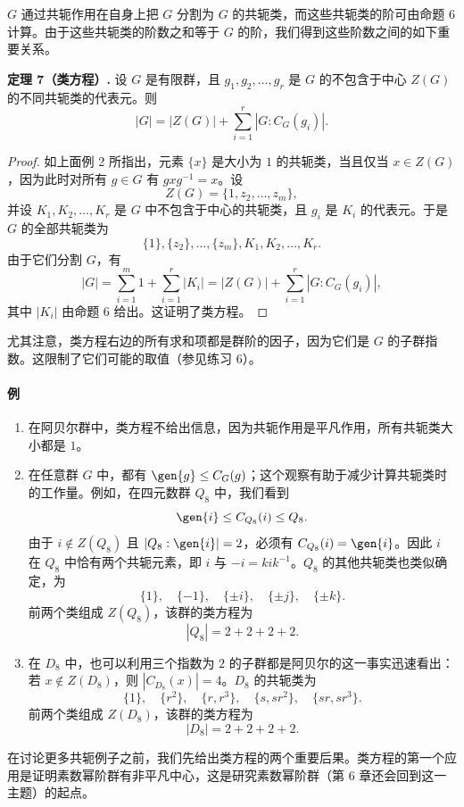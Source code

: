 $G$ 通过共轭作用在自身上把 $G$ 分割为 $G$ 的共轭类，而这些共轭类的阶可由命题 6 计算。由于这些共轭类的阶数之和等于 $G$ 的阶，我们得到这些阶数之间的如下重要关系。

\medskip
\noindent\textbf{定理 7（类方程）.} 设 $G$ 是有限群，且 $g_1,g_2,\ldots,g_r$ 是 $G$ 的不包含于中心 $Z(G)$ 的不同共轭类的代表元。则
\[
  |G|=|Z(G)|+\sum_{i=1}^r |G:C_G(g_i)|.
\]

\begin{proof}
如上面例 2 所指出，元素 $\{x\}$ 是大小为 $1$ 的共轭类，当且仅当 $x\in Z(G)$，因为此时对所有 $g\in G$ 有 $gxg^{-1}=x$。设
\[
  Z(G)=\{1,z_2,\ldots,z_m\},
\]
并设 $K_1,K_2,\ldots,K_r$ 是 $G$ 中不包含于中心的共轭类，且 $g_i$ 是 $K_i$ 的代表元。于是 $G$ 的全部共轭类为
\[
  \{1\},\{z_2\},\ldots,\{z_m\},K_1,K_2,\ldots,K_r.
\]
由于它们分割 $G$，有
\[
  |G|=\sum_{i=1}^m1+\sum_{i=1}^r |K_i|
      =|Z(G)|+\sum_{i=1}^r |G:C_G(g_i)|,
\]
其中 $|K_i|$ 由命题 6 给出。这证明了类方程。
\end{proof}

尤其注意，类方程右边的所有求和项都是群阶的因子，因为它们是 $G$ 的子群指数。这限制了它们可能的取值（参见练习 6）。

\paragraph{例}
\begin{enumerate}[label=(\arabic*)]
  \item 在阿贝尔群中，类方程不给出信息，因为共轭作用是平凡作用，所有共轭类大小都是 $1$。
  \item 在任意群 $G$ 中，都有 $\gen{g}\leq C_G(g)$；这个观察有助于减少计算共轭类时的工作量。例如，在四元数群 $Q_8$ 中，我们看到
  \[
    \gen{i}\leq C_{Q_8}(i)\leq Q_8.
  \]
  由于 $i\notin Z(Q_8)$ 且 $|Q_8:\gen{i}|=2$，必须有 $C_{Q_8}(i)=\gen{i}$。因此 $i$ 在 $Q_8$ 中恰有两个共轭元素，即 $i$ 与 $-i=kik^{-1}$。$Q_8$ 的其他共轭类也类似确定，为
  \[
    \{1\},\quad \{-1\},\quad \{\pm i\},\quad \{\pm j\},\quad \{\pm k\}.
  \]
  前两个类组成 $Z(Q_8)$，该群的类方程为
  \[
    |Q_8|=2+2+2+2.
  \]
  \item 在 $D_8$ 中，也可以利用三个指数为 $2$ 的子群都是阿贝尔的这一事实迅速看出：若 $x\notin Z(D_8)$，则 $|C_{D_8}(x)|=4$。$D_8$ 的共轭类为
  \[
    \{1\},\quad \{r^2\},\quad \{r,r^3\},\quad \{s,sr^2\},\quad \{sr,sr^3\}.
  \]
  前两个类组成 $Z(D_8)$，该群的类方程为
  \[
    |D_8|=2+2+2+2.
  \]
\end{enumerate}

在讨论更多共轭例子之前，我们先给出类方程的两个重要后果。类方程的第一个应用是证明素数幂阶群有非平凡中心，这是研究素数幂阶群（第 6 章还会回到这一主题）的起点。


